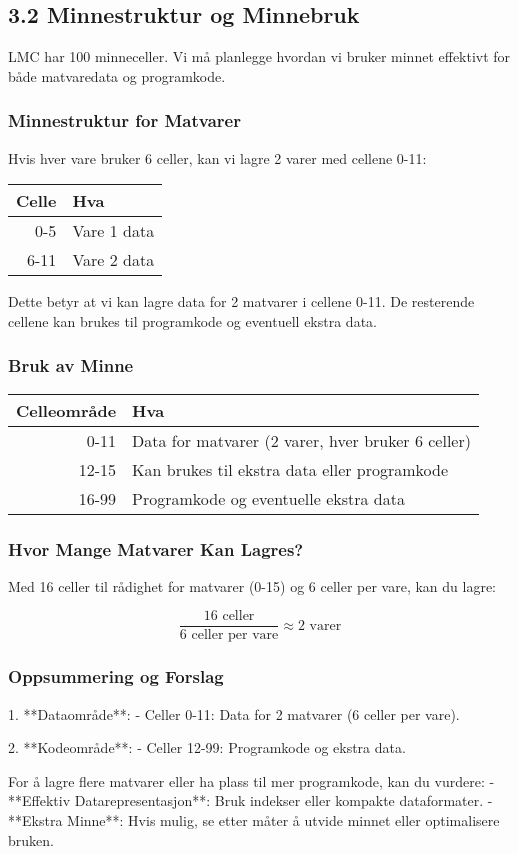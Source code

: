 \documentclass[11pt, oneside]{article}   	%
\begin{document}
\subsection*{3.2 Minnestruktur og Minnebruk}

LMC har 100 minneceller. Vi må planlegge hvordan vi bruker minnet effektivt for både matvaredata og programkode.

\subsubsection*{Minnestruktur for Matvarer}

Hvis hver vare bruker 6 celler, kan vi lagre 2 varer med cellene 0-11:

\begin{tabular}{|r|l|}
    \hline
    Celle & Hva            \\
    \hline
    0-5   & Vare 1 data    \\
    6-11  & Vare 2 data    \\
    \hline
\end{tabular}

Dette betyr at vi kan lagre data for 2 matvarer i cellene 0-11. De resterende cellene kan brukes til programkode og eventuell ekstra data.

\subsubsection*{Bruk av Minne}

\begin{tabular}{|r|l|}
    \hline
    Celleområde  & Hva            \\
    \hline
    0-11         & Data for matvarer (2 varer, hver bruker 6 celler) \\
    12-15        & Kan brukes til ekstra data eller programkode \\
    16-99        & Programkode og eventuelle ekstra data \\
    \hline
\end{tabular}

\subsubsection*{Hvor Mange Matvarer Kan Lagres?}

Med 16 celler til rådighet for matvarer (0-15) og 6 celler per vare, kan du lagre:

\[
\frac{16 \text{ celler}}{6 \text{ celler per vare}} \approx 2 \text{ varer}
\]

\subsubsection*{Oppsummering og Forslag}

1. **Dataområde**:
   - Celler 0-11: Data for 2 matvarer (6 celler per vare).

2. **Kodeområde**:
   - Celler 12-99: Programkode og ekstra data.

For å lagre flere matvarer eller ha plass til mer programkode, kan du vurdere:
- **Effektiv Datarepresentasjon**: Bruk indekser eller kompakte dataformater.
- **Ekstra Minne**: Hvis mulig, se etter måter å utvide minnet eller optimalisere bruken.
\end{document}
